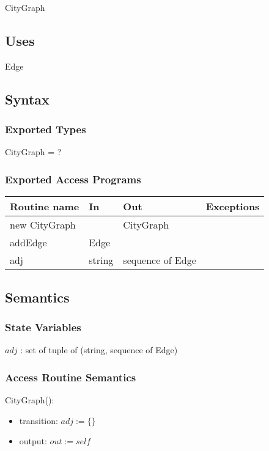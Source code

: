 \documentclass[12pt]{article}
\begin{document}
CityGraph

\subsection* {Uses}

Edge

\subsection* {Syntax}

\subsubsection* {Exported Types}

CityGraph = ?


\subsubsection* {Exported Access Programs}

\begin{tabular}{| l | l | l | p{6cm} |}
\hline
\textbf{Routine name} & \textbf{In} & \textbf{Out} & \textbf{Exceptions}\\
\hline
new CityGraph &  & CityGraph & \\
\hline
addEdge & Edge &  & \\
\hline
adj & string & sequence of Edge & \\
\hline
\end{tabular}

\subsection* {Semantics}

\subsubsection* {State Variables}

$\mathit{adj}$ : set of tuple of (string, sequence of Edge) \\


\subsubsection* {Access Routine Semantics}

CityGraph():
\begin{itemize}
\item transition: $adj := \{\}$ 

\item output: $\mathit{out} := \mathit{self}$
\end{itemize}
\end{document}

